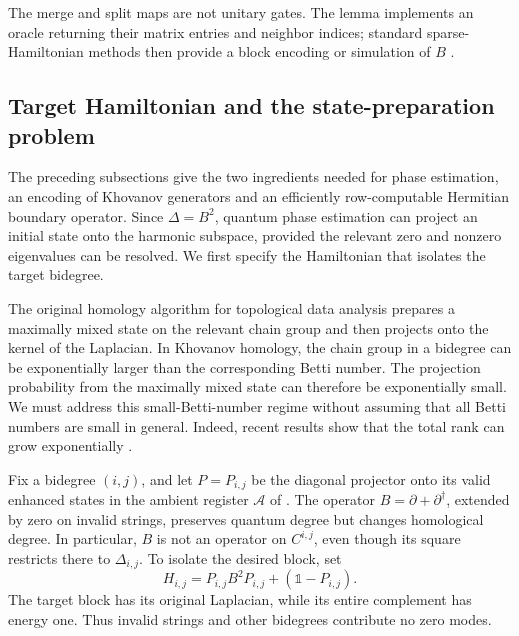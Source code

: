 \documentclass[a4paper,onecolumn,unpublished]{quantumarticle}
\theoremstyle{plain}
\theoremstyle{definition}
\theoremstyle{definition}
\numberwithin{equation}{section}
\newcommand{\del}{\partial}
\begin{document}
The merge and split maps are not unitary gates. The lemma implements an oracle returning their matrix entries and neighbor indices; standard sparse-Hamiltonian methods then provide a block encoding or simulation of $B$ \cite{LowChuang,GilyenSuLowWiebe2019}.


\subsection{Target Hamiltonian and the state-preparation problem}
\label{subsec:Kh-algorithm}

The preceding subsections give the two ingredients needed for phase
estimation, an encoding of Khovanov generators and an efficiently
row-computable Hermitian boundary operator. Since $\Delta=B^2$,
quantum phase estimation can project an initial state onto the harmonic
subspace, provided the relevant zero and nonzero eigenvalues can be resolved.
We first specify the Hamiltonian that isolates the target bidegree.

The original homology algorithm for topological data analysis prepares
a maximally mixed state on the relevant chain group and then projects
onto the kernel of the Laplacian. In Khovanov homology, the chain group
in a bidegree can be exponentially larger than the corresponding Betti
number. The projection probability from the maximally mixed state can
therefore be exponentially small. We must address this small-Betti-number
regime without assuming that all Betti numbers are small in general.
Indeed, recent results show that the total rank can grow exponentially
\cite{kelomaki2026}.

Fix a bidegree $(i,j)$, and let $P=P_{i,j}$ be the diagonal projector
onto its valid enhanced states in the ambient register $\mathcal A$ of
. The operator $B=\del+\del^\dagger$, extended
by zero on invalid strings, preserves quantum degree but changes
homological degree. In particular, $B$ is not an operator on
$C^{i,j}$, even though its square restricts there to $\Delta_{i,j}$.
To isolate the desired block, set
\begin{equation}\label{eq:target-hamiltonian}
 H_{i,j}=P_{i,j}B^2P_{i,j}+(\mathbb 1-P_{i,j}).
\end{equation}
The target block has its original Laplacian, while its entire complement
has energy one. Thus invalid strings and other bidegrees contribute no
zero modes.
\end{document}
